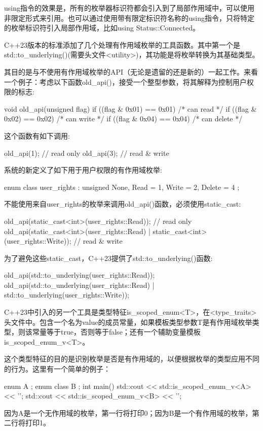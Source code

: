 using指令的效果是，所有的枚举器标识符都会引入到了局部作用域中，可以使用非限定形式来引用。也可以通过使用带有限定标识符名称的using指令，只将特定的枚举标识符引入局部作用域，比如using Status::Connected。

C++23版本的标准添加了几个处理有作用域枚举的工具函数。其中第一个是std::to\_underlying()(需要头文件<utility>)，其功能是将枚举转换为其基础类型。

其目的是与不使用有作用域枚举的API（无论是遗留的还是新的）一起工作。来看一个例子：考虑以下函数old\_api()，接受一个整型参数，将其解释为控制用户权限的标志:

\begin{cpp}
void old_api(unsigned flag)
{
    if ((flag & 0x01) == 0x01) { /* can read */ }
    if ((flag & 0x02) == 0x02) { /* can write */ }
    if ((flag & 0x04) == 0x04) { /* can delete */ }
}
\end{cpp}

这个函数有如下调用:

\begin{cpp}
old_api(1); // read only
old_api(3); // read & write
\end{cpp}

系统的新定义了如下用于用户权限的有作用域枚举:

\begin{cpp}
enum class user_rights : unsigned
{
    None,
    Read = 1,
    Write = 2,
    Delete = 4
};
\end{cpp}

不能使用来自user\_rights的枚举来调用old\_api()函数，必须使用static\_cast:

\begin{cpp}
old_api(static_cast<int>(user_rights::Read)); // read only
old_api(static_cast<int>(user_rights::Read) |
        static_cast<int>(user_rights::Write)); // read & write
\end{cpp}

为了避免这些static\_cast，C++23提供了std::to\_underlying()函数:

\begin{cpp}
old_api(std::to_underlying(user_rights::Read));
old_api(std::to_underlying(user_rights::Read) |
        std::to_underlying(user_rights::Write));
\end{cpp}

C++23中引入的另一个工具是类型特征is\_scoped\_enum<T>，在<type\_traits>头文件中。包含一个名为value的成员常量，如果模板类型参数T是有作用域枚举类型，则该常量等于true，否则等于false；还有一个辅助变量模板is\_scoped\_enum\_v<T>。

这个类型特征的目的是识别枚举是否是有作用域的，以便根据枚举的类型应用不同的行为。这里有一个简单的例子：

\begin{cpp}
enum A {};
enum class B {};
int main()
{
    std::cout << std::is_scoped_enum_v<A> << '\n';
    std::cout << std::is_scoped_enum_v<B> << '\n';
}
\end{cpp}

因为A是一个无作用域的枚举，第一行将打印0；因为B是一个有作用域的枚举，第二行将打印1。










